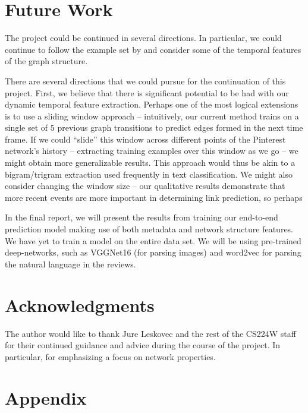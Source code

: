 \documentclass[letterpaper, 10 pt, conference]{ieeeconf}  %
\begin{document}
\section{Future Work}
The project could be continued in several directions. In particular, we could continue to follow the example set by \cite{PintrestProject} and consider some of the temporal features of the graph structure. 


There are several directions that we could pursue for
the continuation of this project. First, we believe that
there is significant potential to be had with our dynamic
temporal feature extraction. Perhaps one of
the most logical extensions is to use a sliding window
approach – intuitively, our current method trains
on a single set of 5 previous graph transitions to predict
edges formed in the next time frame. If we
could “slide” this window across different points of
the Pinterest network’s history – extracting training
examples over this window as we go – we might obtain
more generalizable results. This approach would
thus be akin to a bigram/trigram extraction used frequently
in text classification. We might also consider
changing the window size – our qualitative results
demonstrate that more recent events are more
important in determining link prediction, so perhaps

In the final report, we will present the results from training our end-to-end prediction model making use of both metadata and network structure features. We have yet to train a model on the entire data set. We will be using pre-trained deep-networks, such as VGGNet16 (for parsing images) and word2vec for parsing the natural language in the reviews.

\section{Acknowledgments}
The author would like to thank Jure Leskovec and the rest of the CS224W staff for their continued guidance and advice during the course of the project. In particular, for emphasizing a focus on network properties.

{}


\section{Appendix}
\end{document}
